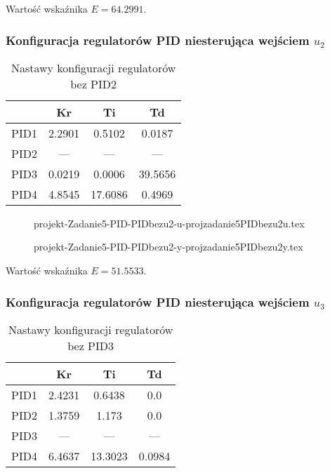 Wartość wskaźnika $E=\num{64.2991}$.

\subsubsection{Konfiguracja regulatorów PID niesterująca wejściem $u_{2}$}

\begin{table}[H]
    \centering
    \begin{tabular}{|l|c|c|c|}
    \hline
         & Kr  & Ti  & Td  \\ \hline
    PID1 & 2.2901 & 0.5102 & 0.0187 \\ \hline
    PID2 & --- & --- & --- \\ \hline
    PID3 & 0.0219 & 0.0006 & 39.5656 \\ \hline
    PID4 & 4.8545 & 17.6086 & 0.4969 \\ \hline
    \end{tabular}
    \caption[H]{Nastawy konfiguracji regulatorów bez PID2}
\end{table}


\ifdefined\CompileFigures
\begin{figure}[H] 
    \centering
    
    \caption{projekt-Zadanie5-PID-PIDbezu2-u-projzadanie5PIDbezu2u.tex}
    \label{projekt:zad5:figure:projzadanie5PIDbezu2u}
\end{figure}
\fi

\ifdefined\CompileFigures
\begin{figure}[H] 
    \centering
    
    \caption{projekt-Zadanie5-PID-PIDbezu2-y-projzadanie5PIDbezu2y.tex}
    \label{projekt:zad5:figure:projzadanie5PIDbezu2y}
\end{figure}
\fi

Wartość wskaźnika $E=\num{51.5533}$.

\subsubsection{Konfiguracja regulatorów PID niesterująca wejściem $u_{3}$}

\begin{table}[H]
    \centering
    \begin{tabular}{|l|c|c|c|}
    \hline
         & Kr  & Ti  & Td  \\ \hline
    PID1 & 2.4231 & 0.6438 & 0.0 \\ \hline
    PID2 & 1.3759 & 1.173 & 0.0 \\ \hline
    PID3 & --- & --- & --- \\ \hline
    PID4 & 6.4637 & 13.3023 & 0.0984 \\ \hline
    \end{tabular}
    \caption[H]{Nastawy konfiguracji regulatorów bez PID3}
\end{table}

